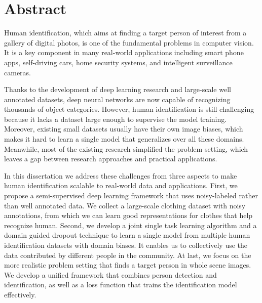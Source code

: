 \chapter*{Abstract}

Human identification, which aims at finding a target person of interest from a gallery of digital photos, is one of the fundamental problems in computer vision. It is a key component in many real-world applications including smart phone apps, self-driving cars, home security systems, and intelligent surveillance cameras.

Thanks to the development of deep learning research and large-scale well annotated datasets, deep neural networks are now capable of recognizing thousands of object categories. However, human identification is still challenging because it lacks a dataset large enough to supervise the model training. Moreover, existing small datasets usually have their own image biases, which makes it hard to learn a single model that generalizes over all these domains. Meanwhile, most of the existing research simplified the problem setting, which leaves a gap between research approaches and practical applications.

In this dissertation we address these challenges from three aspects to make human identification scalable to real-world data and applications. First, we propose a semi-supervised deep learning framework that uses noisy-labeled rather than well annotated data. We collect a large-scale clothing dataset with noisy annotations, from which we can learn good representations for clothes that help recognize human. Second, we develop a joint single task learning algorithm and a domain guided dropout technique to learn a single model from multiple human identification datasets with domain biases. It enables us to collectively use the data contributed by different people in the community. At last, we focus on the more realistic problem setting that finds a target person in whole scene images. We develop a unified framework that combines person detection and identification, as well as a loss function that trains the identification model effectively.